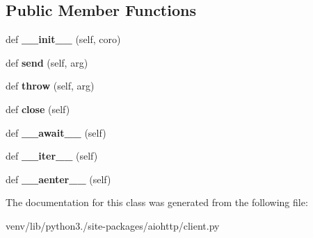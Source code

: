 \subsection*{Public Member Functions}
\begin{DoxyCompactItemize}
\item 
\mbox{\label{classaiohttp_1_1client_1_1___base_request_context_manager_a7e15fd51a084a9a8a370c380113766f0}} 
def {\bfseries \+\_\+\+\_\+init\+\_\+\+\_\+} (self, coro)
\item 
\mbox{\label{classaiohttp_1_1client_1_1___base_request_context_manager_a8c7996938ba9694c546ca1b9c3f3913a}} 
def {\bfseries send} (self, arg)
\item 
\mbox{\label{classaiohttp_1_1client_1_1___base_request_context_manager_aa6bc72037bda73dedc6fb8f7c79a022c}} 
def {\bfseries throw} (self, arg)
\item 
\mbox{\label{classaiohttp_1_1client_1_1___base_request_context_manager_a3126642004e3a6847032f84d2e383df6}} 
def {\bfseries close} (self)
\item 
\mbox{\label{classaiohttp_1_1client_1_1___base_request_context_manager_af823f57ade3ceb8a756c9bac38b0b7c7}} 
def {\bfseries \+\_\+\+\_\+await\+\_\+\+\_\+} (self)
\item 
\mbox{\label{classaiohttp_1_1client_1_1___base_request_context_manager_a9b49827aae7e9575a3b26d5fb91c6778}} 
def {\bfseries \+\_\+\+\_\+iter\+\_\+\+\_\+} (self)
\item 
\mbox{\label{classaiohttp_1_1client_1_1___base_request_context_manager_a7ec5ace910a16bf833690500ea79e5b4}} 
def {\bfseries \+\_\+\+\_\+aenter\+\_\+\+\_\+} (self)
\end{DoxyCompactItemize}


The documentation for this class was generated from the following file\+:\begin{DoxyCompactItemize}
\item 
venv/lib/python3./site-\/packages/aiohttp/client.\+py\end{DoxyCompactItemize}
